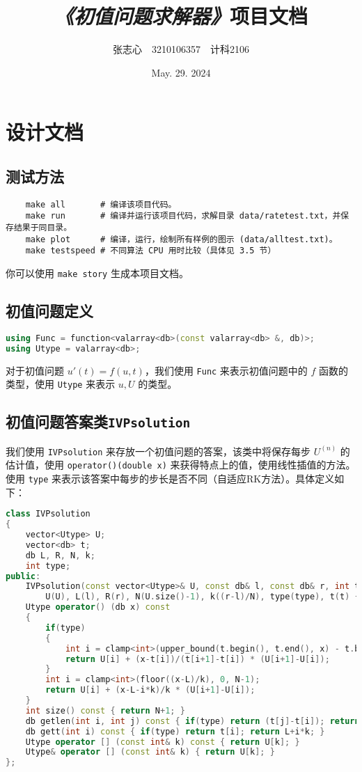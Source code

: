 \documentclass[lang=cn,a4paper,newtx,bibend=bibtex]{elegantpaper}
\title{\emph{《初值问题求解器》}项目文档}
\author{张志心~~3210106357~~计科2106}
\date{May. 29. 2024}
\begin{document}
\maketitle

\tableofcontents
\newpage

\section{设计文档}

\subsection{测试方法}

\begin{verbatim}
    make all       # 编译该项目代码。
    make run       # 编译并运行该项目代码，求解目录 data/ratetest.txt，并保存结果于同目录。
    make plot      # 编译，运行，绘制所有样例的图示 (data/alltest.txt)。
    make testspeed # 不同算法 CPU 用时比较（具体见 3.5 节）
\end{verbatim}

你可以使用 \texttt{make story} 生成本项目文档。

\subsection{初值问题定义}
\begin{lstlisting}[language=C++]
using Func = function<valarray<db>(const valarray<db> &, db)>;
using Utype = valarray<db>;
\end{lstlisting}
对于初值问题 $u'(t)=f(u, t)$，我们使用 \lstinline{Func} 来表示初值问题中的 $f$ 函数的类型，使用 \lstinline{Utype} 来表示 $u,U$ 的类型。

\subsection{初值问题答案类\lstinline{IVPsolution}}
我们使用 \lstinline{IVPsolution} 来存放一个初值问题的答案，该类中将保存每步 $U^{(n)}$ 的估计值，使用 \lstinline{operator()(double x)} 来获得特点上的值，使用线性插值的方法。使用 \lstinline{type} 来表示该答案中每步的步长是否不同（自适应RK方法）。具体定义如下：
\begin{lstlisting}[language=C++]
class IVPsolution
{
    vector<Utype> U;
    vector<db> t;
    db L, R, N, k;
    int type;
public:
    IVPsolution(const vector<Utype>& U, const db& l, const db& r, int type = 0, const vector<db> t=vector<db>(0)):
        U(U), L(l), R(r), N(U.size()-1), k((r-l)/N), type(type), t(t) {}
    Utype operator() (db x) const
    {
        if(type)
        {
            int i = clamp<int>(upper_bound(t.begin(), t.end(), x) - t.begin() - 1, 0, N-1);
            return U[i] + (x-t[i])/(t[i+1]-t[i]) * (U[i+1]-U[i]);
        }
        int i = clamp<int>(floor((x-L)/k), 0, N-1);
        return U[i] + (x-L-i*k)/k * (U[i+1]-U[i]);
    }
    int size() const { return N+1; }
    db getlen(int i, int j) const { if(type) return (t[j]-t[i]); return (j-i)*k; }
    db gett(int i) const { if(type) return t[i]; return L+i*k; }
    Utype operator [] (const int& k) const { return U[k]; }
    Utype& operator [] (const int& k) { return U[k]; }
};
\end{lstlisting}
\end{document}
